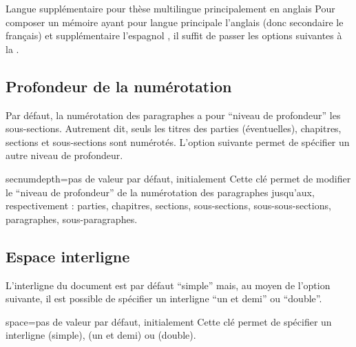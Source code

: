 \begin{dbexample}{Langue supplémentaire pour thèse
    multilingue principalement en anglais}{}
  Pour composer un mémoire ayant pour langue principale l'anglais (donc
  secondaire le français) et supplémentaire l'espagnol , il suffit de passer les options
  suivantes à la \yatcl{}.
\end{dbexample}

\subsection{Profondeur de la numérotation}\label{sec:profondeur-de-la}

Par défaut, la numérotation des paragraphes a pour \enquote{niveau de
  profondeur} les sous-sections. Autrement dit, seuls les titres des parties
(éventuelles), chapitres, sections et sous-sections sont numérotés.  L'option
 suivante permet de spécifier un autre niveau de
profondeur.
%
{%
  \begin{docKey}{secnumdepth}{=\textbar{}\textbar{}\textbar{}\textbar{}\textbar{}\textbar{}}{pas
      de valeur par défaut, initialement }
    Cette clé permet de modifier le \enquote{niveau de profondeur} de la
    numérotation des paragraphes jusqu'aux, respectivement : parties,
    chapitres, sections, sous-sections, sous-sous-sections, paragraphes,
    sous-paragraphes.
  \end{docKey}
}

\subsection{Espace interligne}\label{sec:interligne}

L'interligne du document est par défaut \enquote{simple} mais, au moyen de
l'option  suivante, il est possible de spécifier un interligne
\enquote{un et demi} ou \enquote{double}.

\begin{docKey}{space}{=\textbar{}\textbar{}}{pas de valeur par défaut,
    initialement }
  Cette clé permet de spécifier un interligne  (simple),
   (un et demi) ou  (double).
\end{docKey}

